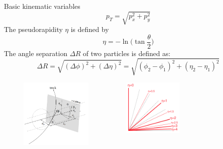 \documentclass[mathserif,serif]{beamer}
\begin{document}
\begin{frame}{Basic kinematic variables}
\begin{equation*}
p_T = \sqrt{p_x^2 + p_y^2}
\end{equation*}
The pseudorapidity $\eta$ is defined by
\begin{equation*}
\eta = - \ln \Big( \tan \frac{\theta}{2} \Big)
\end{equation*}
The angle separation $\Delta R$ of two particles is defined as:
\begin{equation*}
\Delta R = \sqrt{(\Delta \phi) ^2 + (\Delta \eta) ^2}  = \sqrt{(\phi_2 -\phi_1) ^2 + (\eta_2 - \eta_1) ^2}
\end{equation*}
\begin{figure}
\begin{columns}

\begin{column}{0.5\textwidth}
\centering
\includegraphics[width=0.7\textwidth]{data/photo/detector/impact_parameter.png}
\end{column}

\begin{column}{0.5\textwidth}
\centering
\includegraphics[width=0.5\textwidth]{data/photo/detector/pseudorapidity.png}
\end{column}

\end{columns}
\end{figure}
\end{frame}
\end{document}

